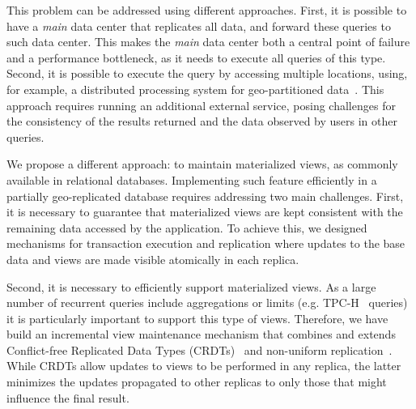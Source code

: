 \documentclass[sigplan,review,anonymous]{acmart}
\begin{document}
This problem can be addressed using different approaches. 
First, it is possible to have a \emph{main} data center that replicates all data, and forward these queries to such data center.
This makes the \emph{main} data center both a central point of failure and a performance bottleneck, as it needs to execute all queries of this type. 
Second, it is possible to execute the query by accessing multiple locations,  using, for example, 
a distributed processing system for geo-partitioned data~\cite{kloudas2015pixida,jetstream}.
This approach requires running an additional external service, posing challenges for the consistency of the results returned and the data observed by users in other queries.

We propose a different approach: to maintain materialized views, as commonly available in relational databases.
Implementing such feature efficiently in a partially geo-replicated database requires 
addressing two main challenges. 
First, it is necessary to guarantee that materialized views are kept consistent with the remaining data
accessed by the application. 
To achieve this, we designed mechanisms for transaction execution and replication where updates 
to the base data and views are made visible atomically in each replica.

Second, it is necessary to efficiently support materialized views. 
As a large number of recurrent queries include aggregations or limits (e.g. TPC-H~\cite{tpch} queries)
it is particularly important to support
this type of views. Therefore, we have build an incremental view maintenance 
mechanism that combines and extends Conflict-free Replicated Data Types (CRDTs)~\cite{crdt} and non-uniform replication~\cite{Cabrita17Nonuniform}.
While CRDTs allow updates to views to be performed in any replica, the latter minimizes
the updates propagated to other replicas to only those that might influence the final result.


\end{document}
